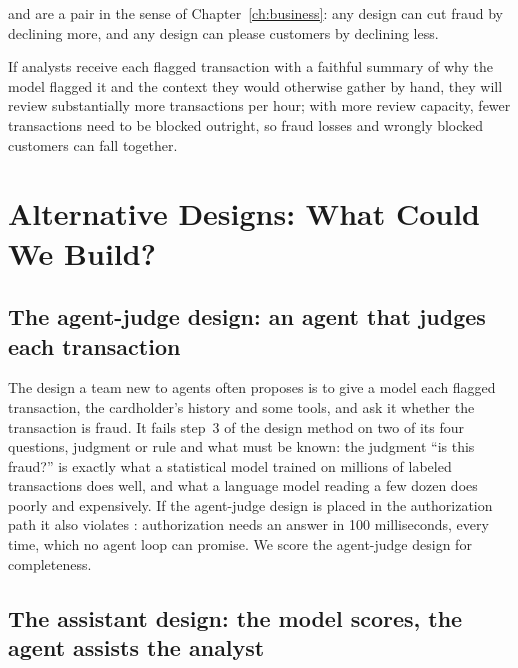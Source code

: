  and  are a pair in the sense of Chapter~\ref{ch:business}: any design can cut fraud by declining more, and any design can please customers by declining less.

\begin{keyidea}
If analysts receive each flagged transaction with a faithful summary of why the model flagged it and the context they would otherwise gather by hand, they will review substantially more transactions per hour; with more review capacity, fewer transactions need to be blocked outright, so fraud losses and wrongly blocked customers can fall together.
\end{keyidea}

\section{Alternative Designs: What Could We Build?}
\label{sec:fr-designs}

\subsection{The agent-judge design: an agent that judges each transaction}

The design a team new to agents often proposes is to give a model each flagged transaction, the cardholder's history and some tools, and ask it whether the transaction is fraud. It fails step~3 of the design method on two of its four questions, judgment or rule and what must be known: the judgment ``is this fraud?'' is exactly what a statistical model trained on millions of labeled transactions does well, and what a language model reading a few dozen does poorly and expensively. If the agent-judge design is placed in the authorization path it also violates : authorization needs an answer in 100 milliseconds, every time, which no agent loop can promise. We score the agent-judge design for completeness.

\subsection{The assistant design: the model scores, the agent assists the analyst}


